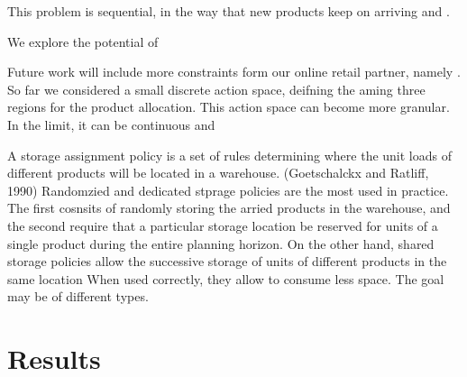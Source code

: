 \documentclass[a4paper,twoside,11pt]{article}
\begin{document}
This problem is sequential, in the way that new products keep on arriving and .

We explore the potential of 

Future work will include more constraints form our online retail partner, namely .
So far we considered a small discrete action space, deifning the aming three regions for the product allocation. This action space can become more granular. In the limit, it can be continuous and 


A storage assignment policy is a set of rules determining where the unit loads of different
products will be located in a warehouse. (Goetschalckx and Ratliff, 1990) Randomzied and dedicated stprage policies are the most used in practice. The first cosnsits of randomly storing the arried products in the warehouse, and the second require that a particular storage location be reserved for units of a single product during the entire planning horizon. On the other hand, shared storage policies allow the successive storage of units of different products in the same location When used correctly, they allow to consume less space.
The goal may be of different types.

\section{Results}

\begin{comment}

\begin{figure}[H]
    \centering
    \texttt{[image: Figures/provided\_data.png]}
    \caption{Provided data.}
    \label{fig:provided_data}
\end{figure}


``Forecast is provided and warehouse state is partially provided''. What does ``partially provided'' mean in this context?


\begin{figure}[H]
    \centering
    \texttt{[image: Figures/interface\_model.png]}
    \caption{Interface model.}
    \label{fig:rl_framework}
\end{figure}

\end{comment}

\newpage


\end{document}
